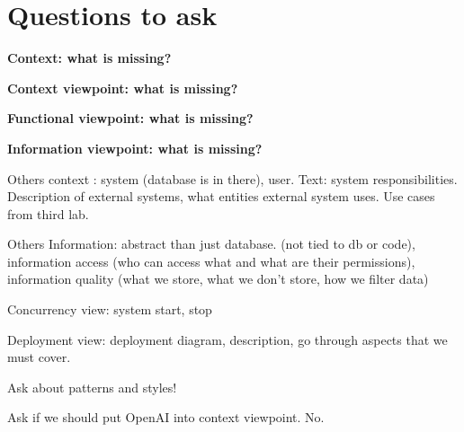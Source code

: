 \documentclass[a4paper,12pt]{article}
\begin{document}
\tableofcontents
\newpage

\section{Questions to ask}

\textbf{Context: what is missing?}

\textbf{Context viewpoint: what is missing?}

\textbf{Functional viewpoint: what is missing?}

\textbf{Information viewpoint: what is missing?}

Others context : system (database is in there), user. Text: system responsibilities. Description of external systems, what entities external system uses. Use cases from third lab.

Others Information: abstract than just database. (not tied to db or code), information access (who can access what and what are their permissions), information quality (what we store, what we don't store, how we filter data)

Concurrency view: system start, stop

Deployment view: deployment diagram, description, go through aspects that we must cover.

Ask about patterns and styles!

Ask if we should put OpenAI into context viewpoint. No.










\listoffigures
\end{document}
